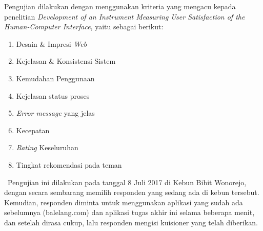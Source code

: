 Pengujian dilakukan dengan menggunakan kriteria yang mengacu kepada penelitian \textit{Development of an Instrument Measuring User Satisfaction of the Human-Computer Interface}\cite{chin_development_1998}, yaitu sebagai berikut:
\begin{enumerate}
	\item Desain \& Impresi \textit{Web}
	\item Kejelasan \& Konsistensi Sistem
	\item Kemudahan Penggunaan
	\item Kejelasan status proses
	\item \textit{Error message} yang jelas
	\item Kecepatan
	\item \textit{Rating} Keseluruhan
	\item Tingkat rekomendasi pada teman
\end{enumerate}
\ \indent Pengujian ini dilakukan pada tanggal 8 Juli 2017 di Kebun Bibit Wonorejo, dengan secara sembarang memilih responden yang sedang ada di kebun tersebut. Kemudian, responden diminta untuk menggunakan aplikasi yang sudah ada sebelumnya (balelang.com) dan aplikasi tugas akhir ini selama beberapa menit, dan setelah dirasa cukup, lalu responden mengisi kuisioner yang telah diberikan.